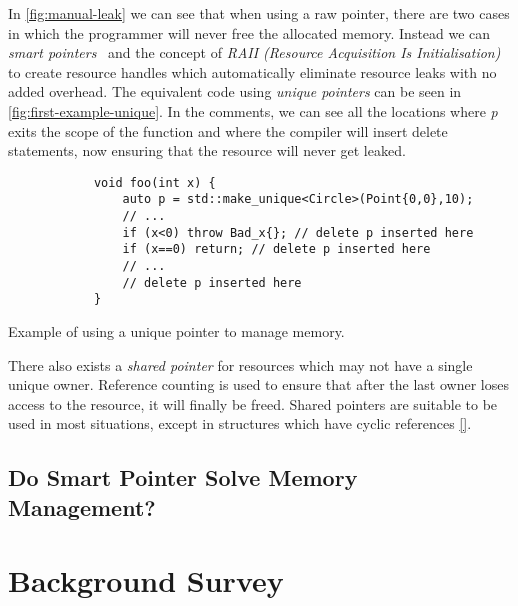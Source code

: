 \documentclass{proposal}
\begin{document}
    In \autoref{fig:manual-leak} we can see that when using a raw pointer, there are two cases in which the programmer will never free the allocated memory.
    Instead we can \emph{smart pointers}~\cite{Dimov2003} and the concept of \emph{RAII (Resource Acquisition Is Initialisation)} to create resource handles which automatically eliminate resource leaks with no added overhead.
    The equivalent code using \emph{unique pointers} can be seen in \autoref{fig:first-example-unique}.
    In the comments, we can see all the locations where \emph{p} exits the scope of the function and where the compiler will insert delete statements, now ensuring that the resource will never get leaked.

    \begin{listing}
        \begin{verbatim}
            void foo(int x) {
                auto p = std::make_unique<Circle>(Point{0,0},10);
                // ...
                if (x<0) throw Bad_x{}; // delete p inserted here
                if (x==0) return; // delete p inserted here
                // ...
                // delete p inserted here
            }
        \end{verbatim}
        \caption{Example of using a unique pointer to manage memory.}
        \label{fig:first-example-unique}
    \end{listing}

    There also exists a \emph{shared pointer} for resources which may not have a single unique owner.
    Reference counting is used to ensure that after the last owner loses access to the resource, it will finally be freed.
    Shared pointers are suitable to be used in most situations, except in structures which have cyclic references \autoref{}.


    \subsection{Do Smart Pointer Solve Memory Management?}\label{subsec:do-smart-pointer-solve-memory-management?}




    \section{Background Survey}\label{sec:background-survey}
\end{document}
